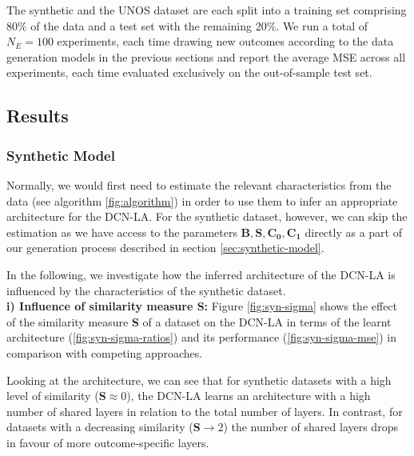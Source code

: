 The synthetic and the UNOS dataset are each split into a training set comprising 80\% of the data and a test set with the remaining 20\%. We run a total of $N_E = 100$ experiments, each time drawing new outcomes according to the data generation models in the previous sections
and report the average MSE across all experiments, each time evaluated exclusively on the out-of-sample test set. 


\subsection{Results}

\subsubsection{Synthetic Model}
Normally, we would first need to estimate the relevant characteristics from the data (see algorithm \ref{fig:algorithm}) in order to use them to infer an appropriate architecture for the DCN-LA. For the synthetic dataset, however, we can skip the estimation as we have access to the parameters $\mathbf{B}, \mathbf{S}, \mathbf{C_0}, \mathbf{C_1}$ directly as a part of our generation process described in  section \ref{sec:synthetic-model}. 

In the following, we investigate how the inferred architecture of the DCN-LA is influenced by the characteristics of the synthetic dataset.  \\

\textbf{i) Influence of similarity measure S:} 
Figure \ref{fig:syn-sigma} shows the effect of the similarity measure \textbf{S} of a dataset on the DCN-LA in terms of the learnt architecture (\ref{fig:syn-sigma-ratios}) and its performance (\ref{fig:syn-sigma-mse}) in comparison with competing approaches. 

Looking at the architecture, we can see that for synthetic datasets with a high level of similarity ($\mathbf{S} \approx 0$), the DCN-LA learns an architecture with a high number of shared layers in relation to the total number of layers. In contrast, for datasets with a decreasing similarity ($\mathbf{S} \rightarrow 2$) %
the number of shared layers drops in favour of more outcome-specific layers. 

